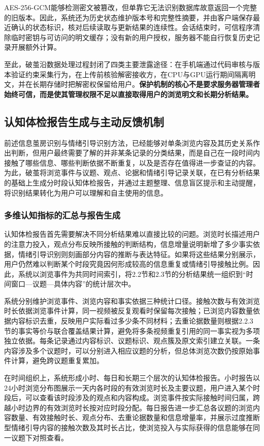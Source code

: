 AES-256-GCM能够检测密文被篡改，但单靠它无法识别数据库故意返回一个完整的旧版本。因此，系统还为历史状态维护版本号和完整性摘要，并由客户端保存最近确认的状态标识，核对后续读取与更新结果的连续性。会话结束时，可信程序清除临时密钥与可访问的明文缓存；没有新的用户授权，服务器不能自行恢复历史记录开展额外计算。

至此，破茧沿数据处理过程封闭了四类主要泄露途径：在手机端通过代码审核与版本验证约束采集行为，在上传前核验解密接收方，在CPU与GPU运行期间隔离明文，并在长期存储时把解密权保留给用户。\textbf{保护机制的核心不是要求服务器管理者始终可信，而是使其管理权限不足以直接取得用户的浏览明文和长期分析结果。}

\subsection{认知体检报告生成与主动反馈机制}\label{section:2.5}

前述信息茧房识别与情绪引导识别方法，已经能够对单条浏览内容及其历史关系作出判断，但用户最终需要了解的并非某条记录的分类结果，而是自己在一段时间内接触了哪些信息、哪些判断依据不断重复，以及是否存在值得进一步查证的内容。为此，破茧将浏览事件与议题、观点、论据和情绪引导记录关联，在已有分析结果的基础上生成分时段认知体检报告，并通过主题整理、信息盲区提示和主动提醒，将识别结果转化为用户可以理解和自主使用的信息。

\subsubsection{多维认知指标的汇总与报告生成}\label{section:2.5.1}

认知体检报告首先需要解决不同分析结果难以直接比较的问题。浏览时长描述用户的注意力投入，观点分布反映所接触的判断结构，信息增量说明新增了多少事实依据，情绪引导识别则刻画部分内容的推断与表达特征。如果将这些结果分别展示，用户仍然难以判断某个时段究竟因何形成较高的信息重复或情绪引导接触比例。因此，系统以浏览事件为共同时间索引，将2.2节和2.3节的分析结果统一组织到``时间窗口---议题---具体内容''的统计层次中。

系统分别维护浏览事件、浏览内容和事实依据三种统计口径。接触次数与有效浏览时长依据浏览事件计算，同一视频被反复观看时保留每次接触；已浏览内容数量依据内容标识去重，反映用户实际看过多少条不同材料；去重论据数量则根据2.2.3节的事实等价与联合覆盖结果计算，避免将多条视频重复引用的同一事实视为多项独立依据。每条记录通过内容标识、议题标识、观点簇及原文索引建立关联。一条内容涉及多个议题时，可以分别进入相应议题的分析，但总体浏览次数仍按原始事件计算，避免跨议题重复累加。

在时间组织上，系统形成小时、每日和长期三个层次的认知体检报告。小时报告以24小时浏览分布图展示一天内各时段的有效浏览时长及主要议题，用户进入某个时段后，可以查看该时段涉及的观点和内容构成。浏览事件按实际接触时间归属，跨越小时边界的有效浏览时长按对应时段分配。每日报告进一步汇总各议题的浏览内容数量、有效接触时长、观点分布、去重论据数量和信息增量率，并展示过度推断型情绪引导内容的接触次数及其时长占比，使浏览投入与实际获得的信息能够在同一议题下对照查看。

